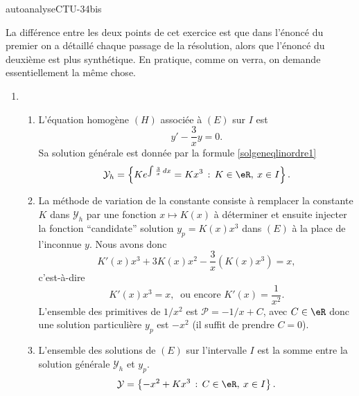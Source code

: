 
\begin{corrige}{autoanalyseCTU-34bis}

La différence entre les deux points de cet exercice est que dans l'énoncé du  premier on a détaillé chaque passage de la résolution, alors que l'énoncé du deuxième est plus synthétique. En pratique, comme on verra, on demande essentiellement la m\^eme chose.  

\begin{enumerate}
\item 
    \begin{enumerate}
    \item L'équation homogène $(H)$ associée à $(E)$ sur $I$ est 
      \begin{equation*}
        y'-\dfrac{3}{x}y=0. 
      \end{equation*}
      Sa solution générale est donnée par la formule \eqref{solgeneqlinordre1}
      \begin{equation*}
        \mathcal{Y}_h=\left\{Ke^{\int\frac{3}{x}\, dx} = Kx^3\,:\, K\in\eR, \: x\in I \right\}.
      \end{equation*}
    \item La méthode de variation de la constante consiste à remplacer la constante $K$ dans $\mathcal{Y}_h$ par une fonction $x\mapsto K(x)$ à déterminer et ensuite injecter la fonction ``candidate'' solution $y_p = K(x)x^3$ dans $(E)$ à la place de l'inconnue $y$. Nous avons donc 
      \begin{equation*}
        K'(x)x^3 + 3 K(x) x^2 -\dfrac{3}{x} (K(x)x^3)  = x,
      \end{equation*}
      c'est-à-dire 
      \begin{equation*}
        K'(x)x^3  = x, \:\text{ ou encore } K'(x)  = \frac{1}{x^2}. 
      \end{equation*}
      L'ensemble des primitives de $1/x^2$ est $\mathcal{P} = -1/x + C$, avec $C\in \eR$ donc une  solution particulière $y_p$ est $-x^2$ (il suffit de prendre $C=0$). 
    \item L'ensemble des solutions de $(E)$ sur l'intervalle $I$ est la somme entre la solution générale $\mathcal{Y}_h$ et $y_p$.
      \begin{equation}\label{solgenexo34bis1}
        \mathcal{Y}=\left\{ -x^2 + Kx^3\,:\, C\in\eR, \: x\in I \right\}.
      \end{equation} 

\end{enumerate}
\end{enumerate}
\end{corrige}
